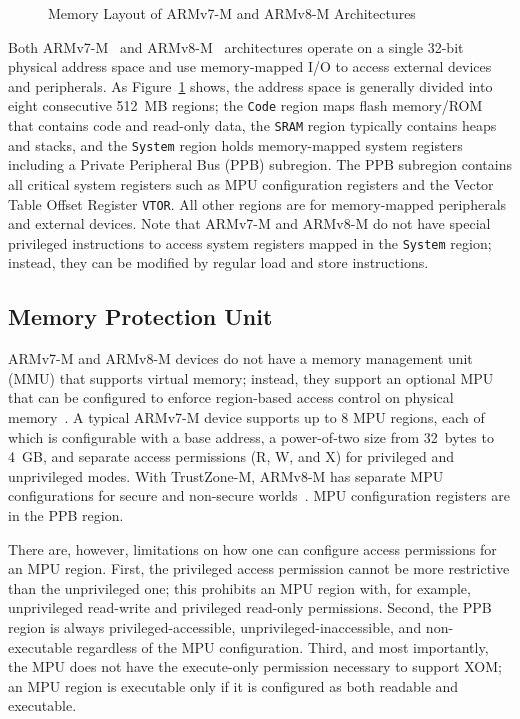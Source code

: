\begin{figure}[tb]
  \centering
  \caption{Memory Layout of ARMv7-M and ARMv8-M Architectures}
  \label{fig:address-space}
\end{figure}

Both ARMv7-M~\cite{ARMv7-M:Manual} and ARMv8-M~\cite{ARMv8-M:Manual}
architectures operate on a single 32-bit
physical address space and use memory-mapped I/O to access external devices and
peripherals.  As Figure~\ref{fig:address-space} shows, the address space
is generally divided into eight consecutive 512~MB regions; the
{\tt Code} region maps flash memory/ROM that contains code and read-only
data, the {\tt SRAM} region typically contains heaps and stacks, and
the {\tt System} region holds memory-mapped system registers including a
Private Peripheral Bus (PPB) subregion.  The PPB subregion contains all
critical system registers such as MPU configuration registers and the
Vector Table Offset Register {\tt VTOR}.
All other regions are for
memory-mapped peripherals and external devices.
Note that ARMv7-M and ARMv8-M do not have special privileged
instructions to access system registers mapped in the {\tt System}
region; instead, they can be modified by regular load and store
instructions.

\subsection{Memory Protection Unit}
\label{sec:bg:mpu}

ARMv7-M and ARMv8-M devices do not have a memory management unit (MMU)
that supports virtual memory; instead, they support an
optional MPU that can be configured to enforce
region-based access control on physical
memory~\cite{ARMv7-M:Manual,ARMv8-M:Manual}.  A typical ARMv7-M device
supports up to 8 MPU regions, each of which is configurable with a
base address, a power-of-two size from 32~bytes to 4~GB, and separate access
permissions (R, W, and X) for privileged and unprivileged
modes.  With TrustZone-M, ARMv8-M has separate MPU
configurations for secure and non-secure worlds~\cite{ARMv8-M:Manual}.
MPU configuration registers are in the PPB region.

There are, however, limitations on how one can configure access permissions
for an MPU region.  First, the privileged access permission cannot be
more restrictive than the unprivileged one; this prohibits an MPU region
with, for example, unprivileged read-write and privileged read-only
permissions.  Second, the PPB region is always privileged-accessible,
unprivileged-inaccessible, and non-executable regardless of the MPU
configuration.  Third, and most importantly, the MPU does not have the
execute-only permission necessary to support XOM; an MPU region is
executable only if it is configured as both readable and executable.

